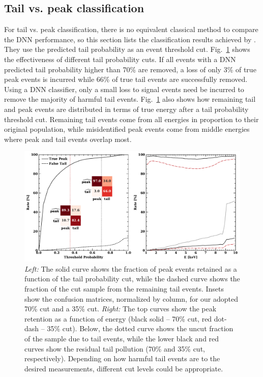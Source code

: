 \subsection{Tail vs. peak classification} For tail vs. peak classification, there is no equivalent classical method to compare the DNN performance, so this section lists the classification results achieved by \citet{peirson_towards_2021}. They use the predicted tail probability as an event threshold cut. Fig.~\ref{fig:tailcut} shows the effectiveness of different tail probability cuts. If all events with a DNN predicted tail probability higher than 70\% are removed, a loss of only 3\% of true peak events is incurred while 66\% of true tail events are successfully removed. Using a DNN classifier, only a small loss to signal events need be incurred to remove the majority of harmful tail events. Fig.~\ref{fig:tailcut} also shows how remaining tail and peak events are distributed in terms of true energy after a tail probability threshold cut. Remaining tail events come from all energies in proportion to their original population, while misidentified peak events come from middle energies where peak and tail events overlap most.

\begin{figure}[t]
\centering
\includegraphics[width=1.0\textwidth]{figures/fig5.pdf}
\caption{\textit{Left:} The solid curve shows the fraction of peak events retained as a function of the tail probability cut, while the dashed curve shows the fraction of the cut sample from the remaining tail events. Insets show the confusion matrices, normalized by column, for our adopted 70\% cut and a 35\% cut. \textit{Right:} The top curves show the peak retention as a function of energy (black solid -- 70\% cut, red dot-dash -- 35\% cut). Below, the dotted curve shows the uncut fraction of the sample due to tail events, while the lower black and red curves show the residual tail pollution (70\% and 35\% cut, respectively). Depending on how harmful tail events are to the desired measurements, different cut levels could be appropriate.}
\label{fig:tailcut}
\end{figure}

